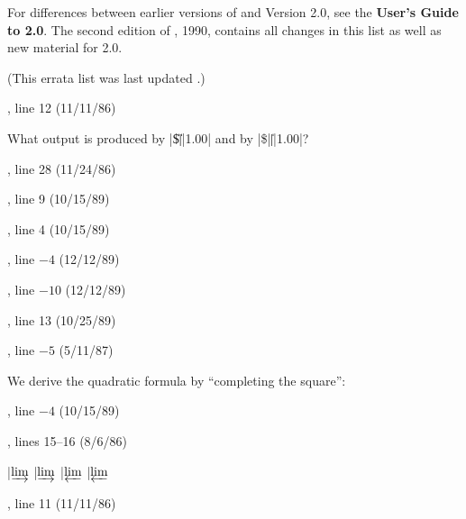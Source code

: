 For differences between earlier versions of \AmSTeX{} and Version 2.0,
see the {\bf User's Guide to \AmSTeX{} 2.0}.
The second edition of \JoT{}, 1990, contains all changes in this list
as well as new material for \AmSTeX{} 2.0.

(This errata list was last updated \lastupdate.)


, line 12 (11/11/86)

\noindent
What output is produced by |\$\|\SP|\|\SP|1.00| and by |\$|\SP|\|\SP|1.00|?

, line 28 (11/24/86)


, line 9 (10/15/89)


, line 4 (10/15/89)


, line $-4$ (12/12/89)


, line $-10$ (12/12/89)


, line 13 (10/25/89)


, line $-5$ (5/11/87)

\centerline{\indent We derive the quadratic formula by
``completing the square'':}

, line $-4$ (10/15/89)


, lines 15--16 (8/6/86)

{\baselineskip 18pt
\ttindent
|$\varinjlim$                           |$\varinjlim$\newline
|$\varprojlim$                          |$\varprojlim$\endgraf
}%

, line 11 (11/11/86)

